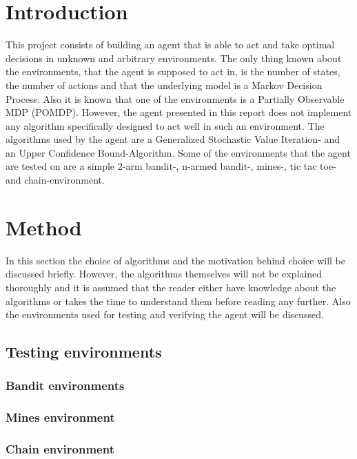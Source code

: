 \documentclass[11pt]{article}
\numberwithin{equation}{section}
\begin{document}
\begin{flushleft}

\section{Introduction}

This project consists of building an agent that is able to act and take optimal decisions in unknown and arbitrary environments. The only thing known about the environments, that the agent is supposed to act in, is the number of states, the number of actions and that the underlying model is a Markov Decision Process. Also it is known that one of the environments is a Partially Observable MDP (POMDP). However, the agent presented in this report does not implement any algorithm specifically designed to act well in such an environment. The algorithms used by the agent are a Generalized Stochastic Value Iteration- and an Upper Confidence Bound-Algorithm. Some of the environments that the agent are tested on are a simple 2-arm bandit-, n-armed bandit-, mines-, tic tac toe- and chain-environment.

\section{Method}

In this section the choice of algorithms and the motivation behind choice will be discussed briefly. However, the algorithms themselves will not be explained thoroughly and it is assumed that the reader either have knowledge about the algorithms or takes the time to understand them before reading any further. Also the environments used for testing and verifying the agent will be discussed.  \newline

\subsection{Testing environments}

\subsubsection{Bandit environments}
\subsubsection{Mines environment}
\subsubsection{Chain environment}

\end{flushleft}
\end{document}
